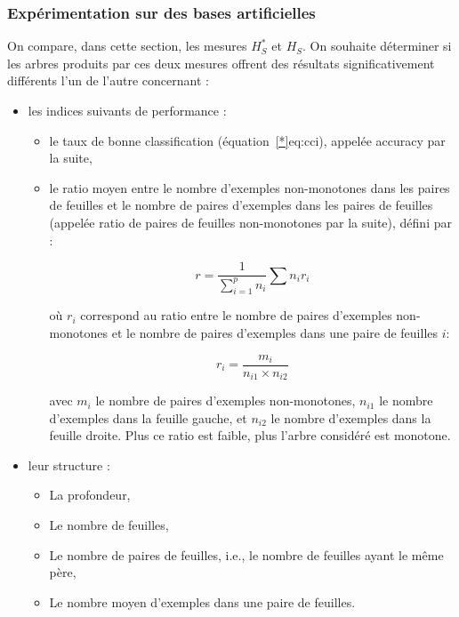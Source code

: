 \documentclass[a4paper]{article}
\renewcommand{\eqref}[1]{équation~\ref{#1}}
\begin{document}
\subsubsection{Expérimentation sur des bases artificielles}

On compare, dans cette section, les mesures $H^*_S$ et $H_S$. On souhaite
déterminer si les arbres produits par ces deux mesures offrent des résultats
significativement différents l'un de l'autre concernant :

\begin{itemize}
    \item les indices suivants de performance : 
    \begin{itemize}
        \item le taux de bonne classification (\eqref*{eq:cci}), appelée accuracy
        par la suite,
       
        \item le ratio moyen entre le nombre d'exemples non-monotones dans les
            paires de feuilles et le nombre de paires d'exemples dans les paires
            de feuilles (appelée ratio de paires de feuilles non-monotones par
            la suite), défini par :

        \begin{equation}
            r = \frac{1}{\sum_{i=1}^{p} n_i} \sum{n_i}{r_i}
        \label{eq:ratio}
        \end{equation}

        où $r_i$ correspond au ratio entre le nombre de paires d'exemples
            non-monotones et le nombre de paires d'exemples dans une paire de
            feuilles $i$:

            $$r_i = \frac{m_i}{n_{i1} \times n_{i2}}$$

        avec $m_i$ le nombre de paires d'exemples non-monotones, $n_{i1}$ le
            nombre d'exemples dans la feuille gauche, et $n_{i2}$ le nombre
            d'exemples dans la feuille droite. Plus ce ratio est faible, plus
            l'arbre considéré est monotone.\\ 

        \end{itemize}
    \item leur structure :
    \begin{itemize}
        \item La profondeur,
        \item Le nombre de feuilles,
        \item Le nombre de paires de feuilles, i.e., le nombre de feuilles ayant
            le même père, 
        \item Le nombre moyen d'exemples dans une paire de feuilles.
    \end{itemize}
    
\end{itemize}
\end{document}
